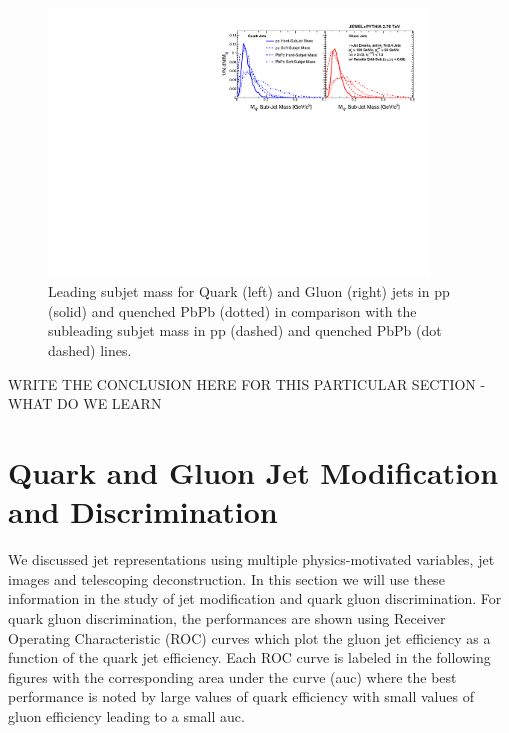 \documentclass[notoc]{JHEP3}
\begin{document}
\begin{figure}[h]
	   \centering
	   \includegraphics[width=0.9\textwidth]{plots/Comp_subjet_m.pdf}
	   \caption{Leading subjet mass for Quark (left) and Gluon (right) jets in pp (solid) and  quenched PbPb (dotted) in comparison with the subleading subjet mass in pp (dashed) and quenched PbPb (dot dashed) lines. }
\label{fig:comp_subjet_m}
\end{figure}

WRITE THE CONCLUSION HERE FOR THIS PARTICULAR SECTION - WHAT DO WE LEARN 

\section{Quark and Gluon Jet Modification and Discrimination}
\label{sec:results}

We discussed jet representations using multiple physics-motivated variables, jet images and telescoping deconstruction. In this section we will use these information in the study of jet modification and quark gluon discrimination. For quark gluon discrimination, the performances are shown using Receiver Operating Characteristic (ROC) curves which plot the gluon jet efficiency as a function of the quark jet efficiency. Each ROC curve is labeled in the following figures with the corresponding area under the curve (auc) where the best performance is noted by large values of quark efficiency with small values of gluon efficiency leading to a small auc. 
\end{document}
